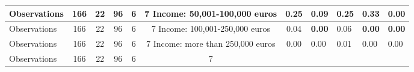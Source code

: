 \begin{tabular}{l c c c c c c }
\midrule
Observations &       166 &        22 &        96 &         6 &         7
Income: 50,001-100,000 euros &      0.25 & \textbf{     0.09} &      0.25 &      0.33 & \textbf{     0.00} \\
\midrule
Observations &       166 &        22 &        96 &         6 &         7
Income: 100,001-250,000 euros &      0.04 & \textbf{     0.00} &      0.06 & \textbf{     0.00} & \textbf{     0.00} \\
\midrule
Observations &       166 &        22 &        96 &         6 &         7
Income: more than 250,000 euros &      0.00 &      0.00 &      0.01 &      0.00 &      0.00 \\
\midrule
Observations &       166 &        22 &        96 &         6 &         7
\bottomrule
\end{tabular}
